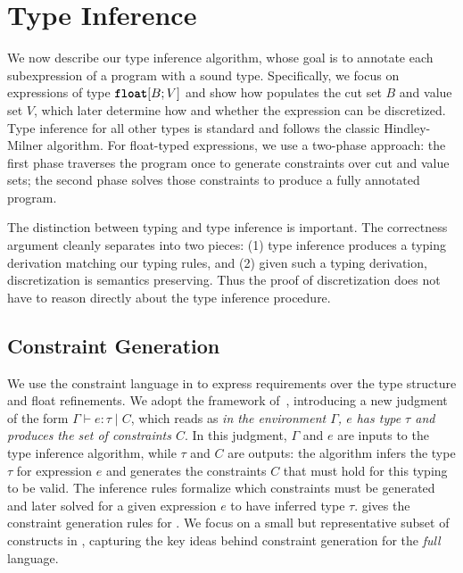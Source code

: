 \section{Type Inference}\label{sec:type-inference}

We now describe our type inference algorithm, whose goal is to annotate each subexpression of a program with a sound type. Specifically, we focus on expressions of type $\textnormal{\ttfamily\bfseries float}[B;V]$ and show how \Slice{} populates the cut set $B$ and value set $V$, which later determine how and whether the expression can be discretized. Type inference for all other types is standard and follows the classic Hindley-Milner algorithm. For float-typed expressions, we use a two-phase approach: the first phase traverses the program once to generate constraints over cut and value sets; the second phase solves those constraints to produce a fully annotated program.

The distinction between typing and type inference is important. The correctness argument cleanly separates into two pieces: (1) type inference produces a typing derivation matching our typing rules, and (2) given such a typing derivation, discretization is semantics preserving. Thus the proof of discretization does not have to reason directly about the type inference procedure.

\subsection{Constraint Generation}

We use the constraint language in  to express requirements over the type structure and float refinements. We adopt the framework of~\cite{Odersky1999ConstrainedTypes}, introducing a new judgment of the form $\Gamma \vdash e : \tau \mid C$, which reads as \emph{in the environment $\Gamma$, $e$ has type $\tau$ and produces the set of constraints $C$}. In this judgment, $\Gamma$ and $e$ are inputs to the type inference algorithm, while $\tau$ and $C$ are outputs: the algorithm infers the type $\tau$ for expression $e$ and generates the constraints $C$ that must hold for this typing to be valid. The inference rules formalize which constraints must be generated and later solved for a given expression $e$ to have inferred type $\tau$.  gives the constraint generation rules for \Slice{}. We focus on a small but representative subset of constructs in \Slice{}, capturing the key ideas behind constraint generation for the \emph{full} language.

